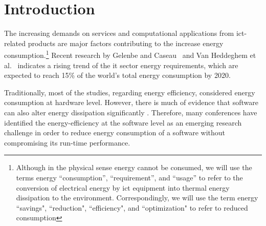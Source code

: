 \section{Introduction}
The increasing demands on services and computational applications 
from {\sc ict}-related products are major factors contributing 
to the increase energy consumption.{\footnote{Although in the physical sense energy 
		cannot be consumed, we will use the terms energy ``consumption'', 
		``requirement'', and ``usage'' to refer to the conversion of 
		electrical energy by {\sc ict} equipment into thermal energy 
		dissipation to the environment. 
		Correspondingly, we will use the term energy ``savings", 
		``reduction", ``efficiency", and ``optimization" to refer 
		to reduced consumption}} 
Recent research by Gelenbe and Caseau~ and 
Van Heddeghem et al.~ indicates a 
rising trend of the {\sc it} sector energy requirements, which are 
expected to reach 15\% of the world's total energy consumption 
by 2020. 


Traditionally, most of the studies, regarding energy efficiency, 
considered energy consumption at hardware level. 
However, there is much of evidence that software can also 
alter energy dissipation significantly \cite{eder_energy_consumptions, 
capra_is_2012, ferreira_seflab_2013}. 
Therefore, many conferences have identified the energy-efficiency 
at the software level as an emerging research challenge in order 
to reduce energy consumption of a software without compromising its 
run-time performance.




